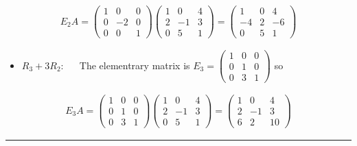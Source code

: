 \documentclass[letterpaper,10pt,english]{jupyterBook}
\begin{document}
\begin{equation*}
\begin{split}E_2A = \begin{pmatrix} 1 & 0 & 0 \\ 0 & -2 & 0 \\ 0 & 0 & 1 \end{pmatrix} \begin{pmatrix} 1 & 0 & 4 \\ 2 & -1 & 3 \\ 0 & 5 & 1 \end{pmatrix}=\begin{pmatrix} 1 & 0 & 4 \\ -4 & 2 & -6 \\ 0 & 5 & 1 \end{pmatrix}\end{split}
\end{equation*}\begin{itemize}
\item {} 
\sphinxAtStartPar
\(R_3 + 3R_2\):   The elementrary matrix is  \(E_3 = \begin{pmatrix} 1 & 0 & 0 \\ 0 & 1 & 0 \\ 0 & 3 & 1 \end{pmatrix}\) so

\end{itemize}
\begin{equation*}
\begin{split}E_3A = \begin{pmatrix} 1 & 0 & 0 \\ 0 & 1 & 0 \\ 0 & 3 & 1 \end{pmatrix} \begin{pmatrix} 1 & 0 & 4 \\ 2 & -1 & 3 \\ 0 & 5 & 1 \end{pmatrix} = \begin{pmatrix} 1 & 0 & 4 \\ 2 & -1 & 3 \\ 6 & 2 & 10 \end{pmatrix}\end{split}
\end{equation*}

\bigskip\hrule\bigskip
\end{document}
